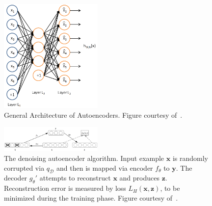 \begin{figure}[h]
    \centering
    \includegraphics[width=0.45\textwidth]{figures/autoencoder.png}
    \caption{General Architecture of Autoencoders.
        Figure courtesy of~\cite{UFLDLAutoencoder}.}
    \label{Fig:AEArchitecture}
\end{figure}

\begin{figure}[h]
    \centering
    \includegraphics[width=0.45\textwidth]{figures/denoiseautoencoder.png}
        \caption{The denoising autoencoder algorithm.
        Input example $\mathbf{x}$ is randomly corrupted via $q_\mathcal{D}$ and then
        is mapped via encoder $f_\theta$ to $\mathbf{y}$.
        The decoder $g_\theta'$ attempts to reconstruct $\mathbf{x}$ and produces $\mathbf{z}$.
        Reconstruction error is measured by loss $L_H(\mathbf{x}, \mathbf{z})$, to be minimized
        during the training phase.
        Figure courtesy of~\cite{DenoiseAE}.}
    \label{Fig:dAEAlgorithm}
\end{figure}

